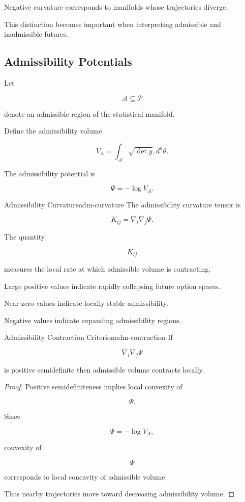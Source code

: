 \documentclass[12pt,twoside,openright]{book}
\begin{document}
Negative curvature corresponds to manifolds whose
trajectories diverge.

This distinction becomes important when interpreting
admissible and inadmissible futures.

\subsection{Admissibility Potentials}

Let

\[
\mathcal A
\subseteq
\mathcal P
\]

denote an admissible region of the statistical manifold.

Define the admissibility volume

\[
V_A
=

\int_{\mathcal A}
\sqrt{\det g}
,d^n\theta.
\]

The admissibility potential is

\[
\Psi
=

-\log V_A.
\]

\begin{definition}{Admissibility Curvature}{adm-curvature}
The admissibility curvature tensor is

\[
K_{ij}
=

\nabla_i\nabla_j \Psi.
\]
\end{definition}

The quantity

\[
K_{ij}
\]

measures the local rate at which admissible volume is
contracting.

Large positive values indicate rapidly collapsing future
option spaces.

Near-zero values indicate locally stable admissibility.

Negative values indicate expanding admissibility regions.

\begin{proposition}{Admissibility Contraction Criterion}{adm-contraction}
If

\[
\nabla_i\nabla_j\Psi
\]

is positive semidefinite then admissible volume contracts
locally.
\end{proposition}

\begin{proof}
Positive semidefiniteness implies local convexity of

\[
\Psi.
\]

Since

\[
\Psi=-\log V_A,
\]

convexity of

\[
\Psi
\]

corresponds to local concavity of admissible volume.

Thus nearby trajectories move toward decreasing
admissibility volume.
\end{proof}
\end{document}
